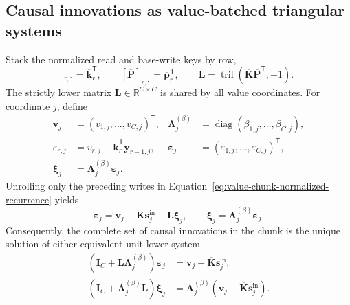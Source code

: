 \documentclass[11pt]{article}
\newcommand{\R}{\mathbb{R}}
\newcommand{\ve}[1]{\boldsymbol{#1}}
\newcommand{\tr}{\mathsf{T}}
\newcommand{\diag}{\operatorname{diag}}
\begin{document}
\subsection{Causal innovations as value-batched triangular systems}
\label{app:value-wise-triangular-system}

Stack the normalized read and base-write keys by row,
\begin{equation}
  [\overline{\ve{K}}]_{r,:}=\overline{\ve{k}}_r^{\tr},
  \qquad
  [\overline{\ve{P}}]_{r,:}=\overline{\ve{p}}_r^{\tr},
  \qquad
  \ve{L}=\operatorname{tril}
  \left(\overline{\ve{K}}\overline{\ve{P}}^{\tr},-1\right).
  \label{eq:value-chunk-shared-score}
\end{equation}
The strictly lower matrix $\ve{L}\in\R^{C\times C}$ is shared by all value coordinates.  For
coordinate $j$, define
\begin{equation}
\begin{aligned}
  \ve{v}_j&=(v_{1,j},\ldots,v_{C,j})^{\tr},
  &
  \ve{\Lambda}^{(\beta)}_j
  &=\diag(\beta_{1,j},\ldots,\beta_{C,j}),
  \\
  \varepsilon_{r,j}
  &=v_{r,j}-\overline{\ve{k}}_r^{\tr}\ve{y}_{r-1,j},
  &
  \ve{\varepsilon}_j
  &=(\varepsilon_{1,j},\ldots,\varepsilon_{C,j})^{\tr},
  \\
  \ve{\xi}_j&=\ve{\Lambda}^{(\beta)}_j\ve{\varepsilon}_j.
\end{aligned}
  \label{eq:value-chunk-innovation-definitions}
\end{equation}
Unrolling only the preceding writes in
Equation~\eqref{eq:value-chunk-normalized-recurrence} yields
\begin{equation}
  \ve{\varepsilon}_j
  =\ve{v}_j-\overline{\ve{K}}\ve{s}^{\mathrm{in}}_j-\ve{L}\ve{\xi}_j,
  \qquad
  \ve{\xi}_j=\ve{\Lambda}^{(\beta)}_j\ve{\varepsilon}_j.
  \label{eq:value-chunk-causal-unrolling}
\end{equation}
Consequently, the complete set of causal innovations in the chunk is the unique solution of either
equivalent unit-lower system
\begin{equation}
\begin{aligned}
  (\ve{I}_C+\ve{L}\ve{\Lambda}^{(\beta)}_j)\ve{\varepsilon}_j
  &=\ve{v}_j-\overline{\ve{K}}\ve{s}^{\mathrm{in}}_j,
  \\
  (\ve{I}_C+\ve{\Lambda}^{(\beta)}_j\ve{L})\ve{\xi}_j
  &=\ve{\Lambda}^{(\beta)}_j
    (\ve{v}_j-\overline{\ve{K}}\ve{s}^{\mathrm{in}}_j).
\end{aligned}
  \label{eq:value-chunk-two-triangular-forms}
\end{equation}
\end{document}
